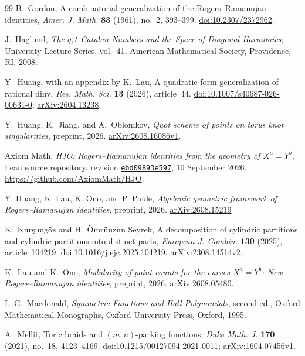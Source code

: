\documentclass[12pt,reqno]{amsart}
\numberwithin{equation}{section}
\theoremstyle{definition}
\theoremstyle{remark}
\theoremstyle{plain}
\begin{document}
\begin{thebibliography}{99}
B.~Gordon,
A combinatorial generalization of the Rogers--Ramanujan identities,
\emph{Amer. J. Math.} \textbf{83} (1961), no.~2, 393--399.
\href{https://doi.org/10.2307/2372962}{doi:10.2307/2372962}.

J.~Haglund,
\emph{The $q,t$-Catalan Numbers and the Space of Diagonal Harmonics},
University Lecture Series, vol.~41, American Mathematical Society, Providence, RI, 2008.

Y.~Huang, with an appendix by K.~Lau,
A quadratic form generalization of rational dinv,
\emph{Res. Math. Sci.} \textbf{13} (2026), article~44.
\href{https://doi.org/10.1007/s40687-026-00631-0}{doi:10.1007/s40687-026-00631-0};
\href{https://arxiv.org/abs/2604.13238}{arXiv:2604.13238}.

Y.~Huang, R.~Jiang, and A.~Oblomkov,
\emph{Quot scheme of points on torus knot singularities},
preprint, 2026.
\href{https://arxiv.org/abs/2608.16086v1}{arXiv:2608.16086v1}.


Axiom Math,
\emph{HJO: Rogers--Ramanujan identities from the geometry of $X^a=Y^b$},
Lean source repository, revision
\href{https://github.com/AxiomMath/HJO/tree/ebd09893e5972bf8934a5d15991909485751d7f2}{\texttt{ebd09893e597}}, 10 September 2026.
\url{https://github.com/AxiomMath/HJO}.

 Y. Huang, K. Lau, K. Ono, and P. Paule,
\emph{Algebraic geometric framework of Rogers--Ramanujan identities}, preprint, 2026. \href{https://arxiv.org/abs/2608.15219}{arXiv:2608.15219}


K.~Kur\c{s}ung\"oz and H.~\"Omr\"uuzun Seyrek,
A decomposition of cylindric partitions and cylindric partitions into distinct parts,
\emph{European J. Combin.} \textbf{130} (2025), article~104219.
\href{https://doi.org/10.1016/j.ejc.2025.104219}{doi:10.1016/j.ejc.2025.104219}.
\href{https://arxiv.org/abs/2308.14514v2}{arXiv:2308.14514v2}.


K.~Lau and K.~Ono,
\emph{Modularity of point counts for the curves $X^a=Y^b$: New Rogers--Ramanujan identities},
preprint, 2026.
\href{https://arxiv.org/abs/2608.05480}{arXiv:2608.05480}.

I.~G.~Macdonald,
\emph{Symmetric Functions and Hall Polynomials}, second ed.,
Oxford Mathematical Monographs, Oxford University Press, Oxford, 1995.

A.~Mellit,
Toric braids and $(m,n)$-parking functions,
\emph{Duke Math. J.} \textbf{170} (2021), no.~18, 4123--4169.
\href{https://doi.org/10.1215/00127094-2021-0011}{doi:10.1215/00127094-2021-0011};
\href{https://arxiv.org/abs/1604.07456v1}{arXiv:1604.07456v1}.


\end{thebibliography}
\end{document}
